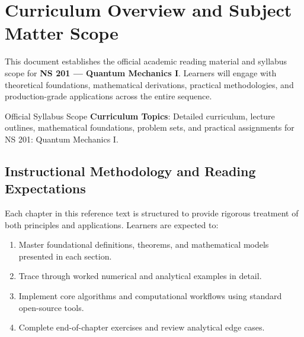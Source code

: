 \section{Curriculum Overview and Subject Matter Scope}

This document establishes the official academic reading material and syllabus scope for \textbf{NS 201 --- Quantum Mechanics I}. Learners will engage with theoretical foundations, mathematical derivations, practical methodologies, and production-grade applications across the entire sequence.

\begin{InsightBox}{Official Syllabus Scope}
  \textbf{Curriculum Topics}: Detailed curriculum, lecture outlines, mathematical foundations, problem sets, and practical assignments for NS 201: Quantum Mechanics I.
\end{InsightBox}

\subsection{Instructional Methodology and Reading Expectations}

Each chapter in this reference text is structured to provide rigorous treatment of both principles and applications. Learners are expected to:
\begin{enumerate}
  \item Master foundational definitions, theorems, and mathematical models presented in each section.
  \item Trace through worked numerical and analytical examples in detail.
  \item Implement core algorithms and computational workflows using standard open-source tools.
  \item Complete end-of-chapter exercises and review analytical edge cases.
\end{enumerate}

